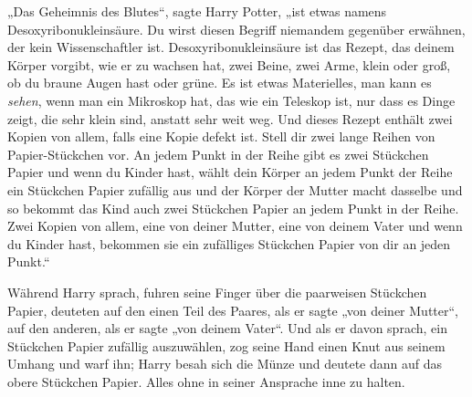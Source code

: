 „Das Geheimnis des Blutes“, sagte Harry Potter, „ist etwas namens Desoxyribonukleinsäure. Du wirst diesen Begriff niemandem gegenüber erwähnen, der kein Wissenschaftler ist. Desoxyribonukleinsäure ist das Rezept, das deinem Körper vorgibt, wie er zu wachsen hat, zwei Beine, zwei Arme, klein oder groß, ob du braune Augen hast oder grüne. Es ist etwas Materielles, man kann es \emph{sehen}, wenn man ein Mikroskop hat, das wie ein Teleskop ist, nur dass es Dinge zeigt, die sehr klein sind, anstatt sehr weit weg. Und dieses Rezept enthält zwei Kopien von allem, falls eine Kopie defekt ist. Stell dir zwei lange Reihen von Papier-Stückchen vor. An jedem Punkt in der Reihe gibt es zwei Stückchen Papier und wenn du Kinder hast, wählt dein Körper an jedem Punkt der Reihe ein Stückchen Papier zufällig aus und der Körper der Mutter macht dasselbe und so bekommt das Kind auch zwei Stückchen Papier an jedem Punkt in der Reihe. Zwei Kopien von allem, eine von deiner Mutter, eine von deinem Vater und wenn du Kinder hast, bekommen sie ein zufälliges Stückchen Papier von dir an jeden Punkt.“

Während Harry sprach, fuhren seine Finger über die paarweisen Stückchen Papier, deuteten auf den einen Teil des Paares, als er sagte „von deiner Mutter“, auf den anderen, als er sagte „von deinem Vater“. Und als er davon sprach, ein Stückchen Papier zufällig auszuwählen, zog seine Hand einen Knut aus seinem Umhang und warf ihn; Harry besah sich die Münze und deutete dann auf das obere Stückchen Papier. Alles ohne in seiner Ansprache inne zu halten.

